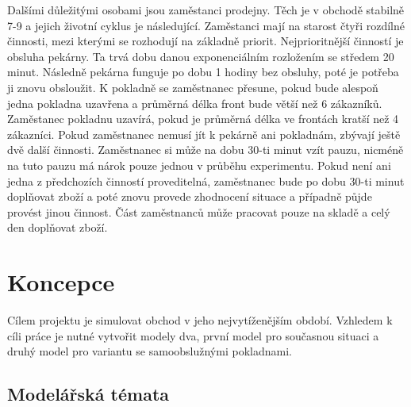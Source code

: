 \documentclass[12pt,a4paper,titlepage]{article}
\begin{document}
Dalšími důležitými osobami jsou zaměstanci prodejny. Těch je v obchodě stabilně 7-9 a jejich životní cyklus je následující. Zaměstanci mají na starost čtyři rozdílné činnosti, mezi kterými se rozhodují na základně priorit. Nejprioritnější činností je obsluha pekárny. Ta trvá dobu danou exponenciálním rozložením se středem 20 minut. Následně pekárna funguje po dobu 1 hodiny bez obsluhy, poté je potřeba ji znovu obsloužit. K pokladně se zaměstnanec přesune, pokud bude alespoň jedna pokladna uzavřena a průměrná délka front bude větší než 6 zákazníků. Zaměstanec pokladnu uzavírá, pokud je průměrná délka ve frontách kratší než 4 zákazníci. Pokud zaměstnanec nemusí jít k pekárně ani pokladnám, zbývají ještě dvě další činnosti. Zaměstnanec si může na dobu 30-ti minut vzít pauzu, nicméně na tuto pauzu má nárok pouze jednou v průběhu experimentu. Pokud není ani jedna z předchozích činností proveditelná, zaměstnanec bude po dobu 30-ti minut doplňovat zboží a poté znovu provede zhodnocení situace a případně půjde provést jinou činnost. Část zaměstnanců může pracovat pouze na skladě a celý den doplňovat zboží.

\section{Koncepce}
Cílem projektu je simulovat obchod v jeho nejvytíženějším období. Vzhledem k cíli práce je nutné vytvořit modely dva, první model pro současnou situaci a druhý model pro variantu se samoobslužnými pokladnami. 

\subsection{Modelářská témata}
\end{document}
